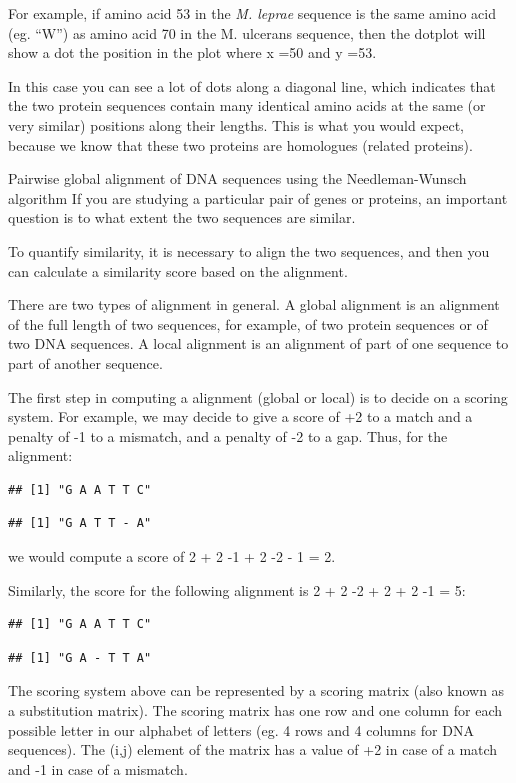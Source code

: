 \documentclass[
]{book}
\begin{document}
For example, if amino acid 53 in the \emph{M. leprae} sequence is the same amino acid (eg. ``W'') as amino acid 70 in the M. ulcerans sequence, then the dotplot will show a dot the position in the plot where x =50 and y =53.

In this case you can see a lot of dots along a diagonal line, which indicates that the two protein sequences contain many identical amino acids at the same (or very similar) positions along their lengths. This is what you would expect, because we know that these two proteins are homologues (related proteins).

Pairwise global alignment of DNA sequences using the Needleman-Wunsch algorithm
If you are studying a particular pair of genes or proteins, an important question is to what extent the two sequences are similar.

To quantify similarity, it is necessary to align the two sequences, and then you can calculate a similarity score based on the alignment.

There are two types of alignment in general. A global alignment is an alignment of the full length of two sequences, for example, of two protein sequences or of two DNA sequences. A local alignment is an alignment of part of one sequence to part of another sequence.

The first step in computing a alignment (global or local) is to decide on a scoring system. For example, we may decide to give a score of +2 to a match and a penalty of -1 to a mismatch, and a penalty of -2 to a gap. Thus, for the alignment:

\begin{verbatim}
## [1] "G A A T T C"
\end{verbatim}

\begin{verbatim}
## [1] "G A T T - A"
\end{verbatim}

we would compute a score of 2 + 2 -1 + 2 -2 - 1 = 2.

Similarly, the score for the following alignment is 2 + 2 -2 + 2 + 2 -1 = 5:

\begin{verbatim}
## [1] "G A A T T C"
\end{verbatim}

\begin{verbatim}
## [1] "G A - T T A"
\end{verbatim}

The scoring system above can be represented by a scoring matrix (also known as a substitution matrix). The scoring matrix has one row and one column for each possible letter in our alphabet of letters (eg. 4 rows and 4 columns for DNA sequences). The (i,j) element of the matrix has a value of +2 in case of a match and -1 in case of a mismatch.
\end{document}
